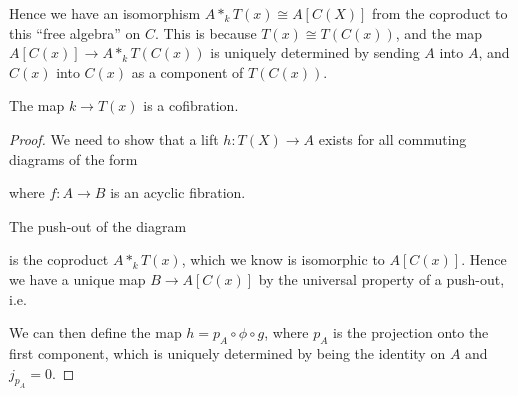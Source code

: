 Hence we have an isomorphism $A\ast_k T(x) \cong A[C(X)]$ from the coproduct to this ``free algebra'' on $C$. This is because $T(x)\cong T(C(x))$, and the map $A[C(x)]\rightarrow A\ast_k T(C(x))$ is uniquely determined by sending $A$ into $A$, and $C(x)$ into $C(x)$ as a component of $T(C(x))$. 


\begin{lemma}
The map $k\longrightarrow T(x)$ is a cofibration. 
\end{lemma}
\begin{proof}
We need to show that a lift $h:T(X)\longrightarrow A$ exists for all commuting diagrams of the form
\begin{center}
\end{center}
where $f\colon A\longrightarrow B$ is an acyclic fibration. 
    
The push-out of the diagram 
\begin{center}
\end{center}
is the coproduct $A\ast_k T(x)$, which we know is isomorphic to $A[C(x)]$. Hence we have a unique map $B\longrightarrow A[C(x)]$ by the universal property of a push-out, i.e. 
\begin{center}
\end{center}
We can then define the map $h = p_A \circ \phi \circ g$, where $p_A$ is the projection onto the first component, which is uniquely determined by being the identity on $A$ and $j_{p_A} = 0$. 
    

\end{proof}
